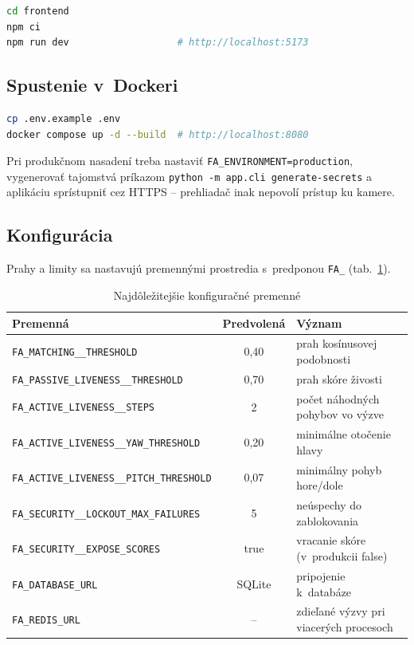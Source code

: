 \begin{lstlisting}[language=bash, caption={Spustenie klienta}]
cd frontend
npm ci
npm run dev                   # http://localhost:5173
\end{lstlisting}

\subsection*{Spustenie v~Dockeri}
\begin{lstlisting}[language=bash]
cp .env.example .env
docker compose up -d --build  # http://localhost:8080
\end{lstlisting}

Pri produkčnom nasadení treba nastaviť \texttt{FA\_ENVIRONMENT=production},
vygenerovať tajomstvá príkazom \texttt{python -m app.cli generate-secrets} a aplikáciu
sprístupniť cez HTTPS -- prehliadač inak nepovolí prístup ku kamere.

\subsection*{Konfigurácia}
Prahy a limity sa nastavujú premennými prostredia s~predponou \texttt{FA\_}
(tab.~\ref{tab:konfiguracia}).

\begin{table}[H]
  \centering
  \caption{Najdôležitejšie konfiguračné premenné}
  \label{tab:konfiguracia}
  \small
  \begin{tabularx}{\textwidth}{@{}l c X@{}}
    \toprule
    Premenná & Predvolená & Význam \\
    \midrule
    \texttt{FA\_MATCHING\_\_THRESHOLD} & 0,40 & prah kosínusovej podobnosti \\
    \texttt{FA\_PASSIVE\_LIVENESS\_\_THRESHOLD} & 0,70 & prah skóre živosti \\
    \texttt{FA\_ACTIVE\_LIVENESS\_\_STEPS} & 2 & počet náhodných pohybov vo výzve \\
    \texttt{FA\_ACTIVE\_LIVENESS\_\_YAW\_THRESHOLD} & 0,20 & minimálne otočenie hlavy \\
    \texttt{FA\_ACTIVE\_LIVENESS\_\_PITCH\_THRESHOLD} & 0,07 & minimálny pohyb hore/dole \\
    \texttt{FA\_SECURITY\_\_LOCKOUT\_MAX\_FAILURES} & 5 & neúspechy do zablokovania \\
    \texttt{FA\_SECURITY\_\_EXPOSE\_SCORES} & true & vracanie skóre (v~produkcii false) \\
    \texttt{FA\_DATABASE\_URL} & SQLite & pripojenie k~databáze \\
    \texttt{FA\_REDIS\_URL} & -- & zdieľané výzvy pri viacerých procesoch \\
    \bottomrule
  \end{tabularx}
\end{table}


